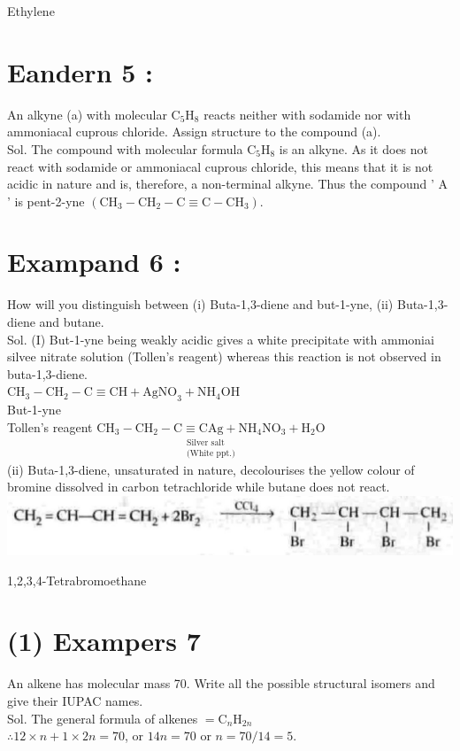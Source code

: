 \documentclass[10pt]{article}
\begin{document}
Ethylene

\section*{Eandern 5 :}
An alkyne (a) with molecular $\mathrm{C}_{5} \mathrm{H}_{8}$ reacts neither with sodamide nor with ammoniacal cuprous chloride. Assign structure to the compound (a).\\
Sol. The compound with molecular formula $\mathrm{C}_{5} \mathrm{H}_{8}$ is an alkyne. As it does not react with sodamide or ammoniacal cuprous chloride, this means that it is not acidic in nature and is, therefore, a non-terminal alkyne. Thus the compound ' A ' is pent-2-yne $\left(\mathrm{CH}_{3}-\mathrm{CH}_{2}-\mathrm{C} \equiv \mathrm{C}-\mathrm{CH}_{3}\right)$.

\section*{Exampand 6 :}
How will you distinguish between (i) Buta-1,3-diene and but-1-yne, (ii) Buta-1,3-diene and butane.\\
Sol. (I) But-1-yne being weakly acidic gives a white precipitate with ammoniai silvee nitrate solution (Tollen's reagent) whereas this reaction is not observed in buta-1,3-diene.\\
$\mathrm{CH}_{3}-\mathrm{CH}_{2}-\mathrm{C} \equiv \mathrm{CH}+\mathrm{AgNO}_{3}+\mathrm{NH}_{4} \mathrm{OH}$\\
But-1-yne\\
Tollen's reagent $\underset{\substack{\text { Silver salt } \\ \text { (White ppt.) }}}{\mathrm{CH}_{3}-\mathrm{CH}_{2}-\mathrm{C} \equiv \mathrm{CAg}+\mathrm{NH}_{4} \mathrm{NO}_{3}+\mathrm{H}_{2} \mathrm{O}}$\\
(ii) Buta-1,3-diene, unsaturated in nature, decolourises the yellow colour of bromine dissolved in carbon tetrachloride while butane does not react.\\
\includegraphics[max width=\textwidth, center]{2025_01_28_8470952b98110cec3aabg-198}

1,2,3,4-Tetrabromoethane

\section*{(1) Exampers 7}
An alkene has molecular mass 70. Write all the possible structural isomers and give their IUPAC names.\\
Sol. The general formula of alkenes $=\mathrm{C}_{n} \mathrm{H}_{2 n}$\\
$\therefore 12 \times n+1 \times 2 n=70$, or $14 n=70$ or $n=70 / 14=5$.
\end{document}
